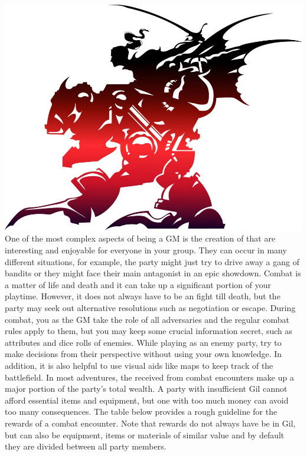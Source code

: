 %
%
\\\\
%
\includegraphics[width=\columnwidth]{./art/images/ff6.jpg}
%
\vfill
%
One of the most complex aspects of being a GM is the creation of  that are interesting and enjoyable for everyone in your group.
They can occur in many different situations, for example, the party might just try to drive away a gang of bandits or they might face their main antagonist in an epic showdown.
Combat is a matter of life and death and it can take up a significant portion of your playtime.
However, it does not always have to be an fight till death, but the party may seek out alternative resolutions such as negotiation or escape.
During combat, you as the GM take the role of all adversaries and the regular combat rules apply to them, but you may keep some crucial information secret, such as attributes and dice rolls of enemies.
While playing as an enemy party, try to make decisions from their perspective without using your own knowledge.
In addition, it is also helpful to use visual aids like maps to keep track of the battlefield.
In most adventures, the  received from combat encounters make up a major portion of the party's total wealth.
A party with insufficient Gil cannot afford essential items and equipment, but one with too much money can avoid too many consequences.
The table below provides a rough guideline for the rewards of a combat encounter.
Note that rewards do not always have be in Gil, but can also be equipment, items or materials of similar value and by default they are divided between all party members.
